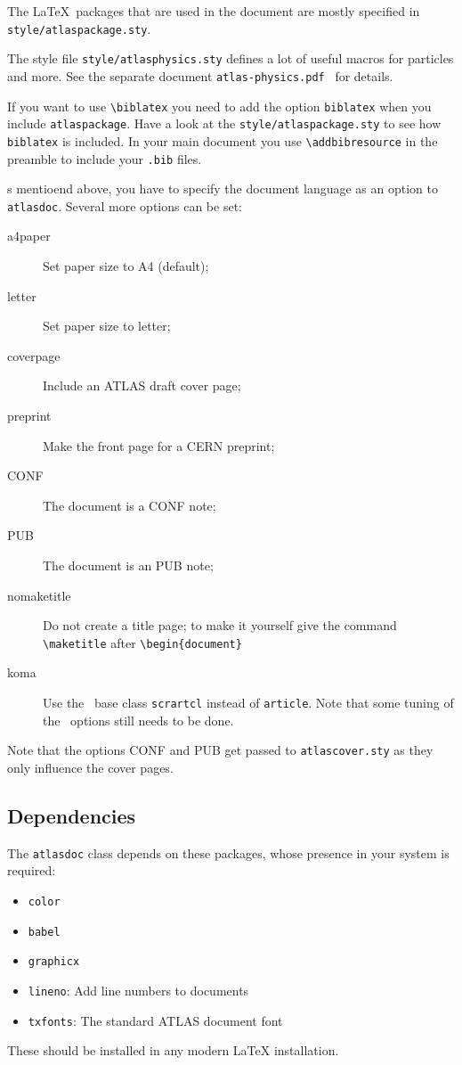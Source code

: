 \documentclass[koma,UKenglish]{style/atlasdoc}
\newcommand{\Macro}[1]{\texttt{\textbackslash #1}\xspace}
\newcommand{\Option}[1]{\textsf{#1}\xspace}
\newcommand{\Package}[1]{\texttt{#1}\xspace}
\begin{document}
The \LaTeX\ packages that are used in the document are mostly specified in 
\texttt{style/atlaspackage.sty}.

The style file \texttt{style/atlasphysics.sty} defines a lot of useful
macros for particles and more. See the separate document
\texttt{atlas-physics.pdf}~\cite{atlas-physics} for details.

If you want to use \Macro{biblatex} you need to add the option \texttt{biblatex} when you
include \texttt{atlaspackage}.
Have a look at the \texttt{style/atlaspackage.sty} to see how \texttt{biblatex} is included.
In your main document you use \Macro{addbibresource} in the preamble to include your \texttt{.bib} files.

s mentioend above, you have to specify the document language as an option to \Package{atlasdoc}.
Several more options can be set:
\begin{description}
\item[a4paper] Set paper size to A4 (default);
\item[letter] Set paper size to letter;
\item[coverpage] Include an ATLAS draft cover page;
\item[preprint] Make the front page for a CERN preprint;
\item[CONF] The document is a CONF note;
\item[PUB] The document is an PUB note;
\item[nomaketitle] Do not create a title page; to make it yourself give the command \Macro{maketitle} after
	\verb|\begin{document}|
\item[koma] Use the \KOMAScript\ base class \Package{scrartcl} instead of \Package{article}. 
	Note that some tuning of the \KOMAScript\ options still needs to be done.
\end{description}
Note that the options \Option{CONF} and \Option{PUB} get passed to \Package{atlascover.sty}
as they only influence the cover pages.

\subsection{Dependencies}

The \texttt{atlasdoc} class depends on these packages, whose presence in
your system is required:
\begin{itemize}\setlength{\parskip}{0pt}\setlength{\itemsep}{0pt}
\item \texttt{color}
\item \texttt{babel}
\item \texttt{graphicx}
\item \texttt{lineno}: Add line numbers to documents
\item \texttt{txfonts}: The standard ATLAS document font
\end{itemize}
These should be installed in any modern \LaTeX{} installation.
\end{document}
